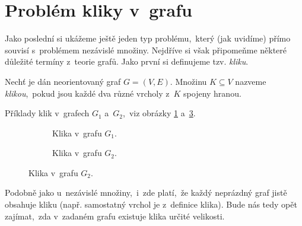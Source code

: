 \section{Problém kliky v~grafu}\label{sec:klika}

Jako poslední si ukážeme ještě jeden typ problému,~který (jak uvidíme) přímo souvisí s~problémem nezávislé množiny. Nejdříve si však připomeňme některé důležité termíny z~teorie grafů. Jako první si definujeme tzv. \emph{kliku}.
\begin{definition}[Klika]
    Nechť je dán neorientovaný graf $G=(V,E)$. Množinu $K\subseteq V$ nazveme \emph{klikou},~pokud jsou každé dva různé vrcholy z~$K$ spojeny hranou.
\end{definition}
\begin{example}
    Příklady klik v~grafech $G_1$ a~$G_2$,~viz obrázky \ref{subfig:priklad_klika1} a~\ref{subfig:priklad_klika2}.
    \begin{figure}[ht]
        \centering
        \begin{subfigure}{7cm}
            \centering
            
            \caption{Klika v~grafu $G_1$.}
            \label{subfig:priklad_klika1}
        \end{subfigure}
        \qquad
        \begin{subfigure}{7cm}
            \centering
            
            \caption{Klika v~grafu $G_2$.}
            \label{subfig:priklad_klika2}
        \end{subfigure}
    \end{figure}
\end{example}
Podobně jako u~nezávislé množiny,~i~zde platí,~že každý neprázdný graf jistě obsahuje kliku (např. samostatný vrchol je z~definice klika). Bude nás tedy opět zajímat,~zda v~zadaném grafu existuje klika určité velikosti.


